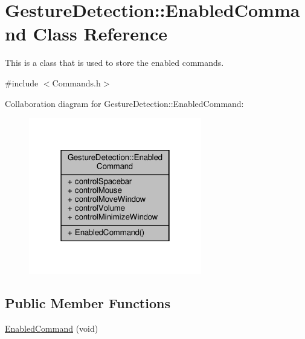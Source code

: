 \hypertarget{class_gesture_detection_1_1_enabled_command}{}\section{Gesture\+Detection\+:\+:Enabled\+Command Class Reference}
\label{class_gesture_detection_1_1_enabled_command}


This is a class that is used to store the enabled commands.  




{\ttfamily \#include $<$Commands.\+h$>$}



Collaboration diagram for Gesture\+Detection\+:\+:Enabled\+Command\+:
\nopagebreak
\begin{figure}[H]
\begin{center}
\leavevmode
\includegraphics[width=214pt]{class_gesture_detection_1_1_enabled_command__coll__graph}
\end{center}
\end{figure}
\subsection*{Public Member Functions}
\begin{DoxyCompactItemize}
\item 
\hyperlink{class_gesture_detection_1_1_enabled_command_a595a6548b56d5a128d27751589f9e2e4}{Enabled\+Command} (void)
\end{DoxyCompactItemize}
